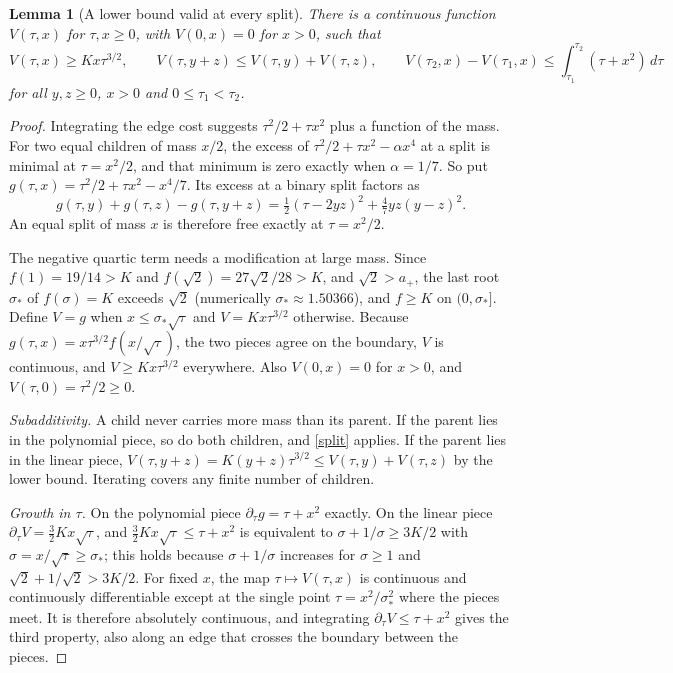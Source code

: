 \documentclass[11pt,a4paper]{article}
\newtheorem{lemma}[theorem]{Lemma}
\theoremstyle{remark}
\begin{document}
\begin{lemma}[A lower bound valid at every split]\label{cal}
There is a continuous function $V(\tau,x)$ for $\tau,x\ge0$, with $V(0,x)=0$ for $x>0$, such that
\[
 V(\tau,x)\ge Kx\tau^{3/2},\qquad V(\tau,y+z)\le V(\tau,y)+V(\tau,z),
 \qquad V(\tau_2,x)-V(\tau_1,x)\le\int_{\tau_1}^{\tau_2}(\tau+x^2)\,d\tau
\]
for all $y,z\ge0$, $x>0$ and $0\le\tau_1<\tau_2$.
\end{lemma}
\begin{proof}
Integrating the edge cost suggests $\tau^2/2+\tau x^2$ plus a function of the mass. For two equal children of mass $x/2$, the excess of $\tau^2/2+\tau x^2-\alpha x^4$ at a split is minimal at $\tau=x^2/2$, and that minimum is zero exactly when $\alpha=1/7$. So put $g(\tau,x)=\tau^2/2+\tau x^2-x^4/7$. Its excess at a binary split factors as
\begin{equation}
 g(\tau,y)+g(\tau,z)-g(\tau,y+z)
   =\tfrac12(\tau-2yz)^2+\tfrac47 yz(y-z)^2. \label{split}
\end{equation}
An equal split of mass $x$ is therefore free exactly at $\tau=x^2/2$.

The negative quartic term needs a modification at large mass. Since $f(1)=19/14>K$ and $f(\sqrt2)=27\sqrt2/28>K$, and $\sqrt2>a_+$, the last root $\sigma_*$ of $f(\sigma)=K$ exceeds $\sqrt2$ (numerically $\sigma_*\approx1.50366$), and $f\ge K$ on $(0,\sigma_*]$. Define $V=g$ when $x\le\sigma_*\sqrt\tau$ and $V=Kx\tau^{3/2}$ otherwise. Because $g(\tau,x)=x\tau^{3/2}f(x/\sqrt\tau)$, the two pieces agree on the boundary, $V$ is continuous, and $V\ge Kx\tau^{3/2}$ everywhere. Also $V(0,x)=0$ for $x>0$, and $V(\tau,0)=\tau^2/2\ge0$.

\emph{Subadditivity.} A child never carries more mass than its parent. If the parent lies in the polynomial piece, so do both children, and \eqref{split} applies. If the parent lies in the linear piece, $V(\tau,y+z)=K(y+z)\tau^{3/2}\le V(\tau,y)+V(\tau,z)$ by the lower bound. Iterating covers any finite number of children.

\emph{Growth in $\tau$.} On the polynomial piece $\partial_\tau g=\tau+x^2$ exactly. On the linear piece $\partial_\tau V=\frac32Kx\sqrt\tau$, and $\frac32Kx\sqrt\tau\le\tau+x^2$ is equivalent to $\sigma+1/\sigma\ge3K/2$ with $\sigma=x/\sqrt\tau\ge\sigma_*$; this holds because $\sigma+1/\sigma$ increases for $\sigma\ge1$ and $\sqrt2+1/\sqrt2>3K/2$. For fixed $x$, the map $\tau\mapsto V(\tau,x)$ is continuous and continuously differentiable except at the single point $\tau=x^2/\sigma_*^2$ where the pieces meet. It is therefore absolutely continuous, and integrating $\partial_\tau V\le\tau+x^2$ gives the third property, also along an edge that crosses the boundary between the pieces.
\end{proof}
\end{document}
